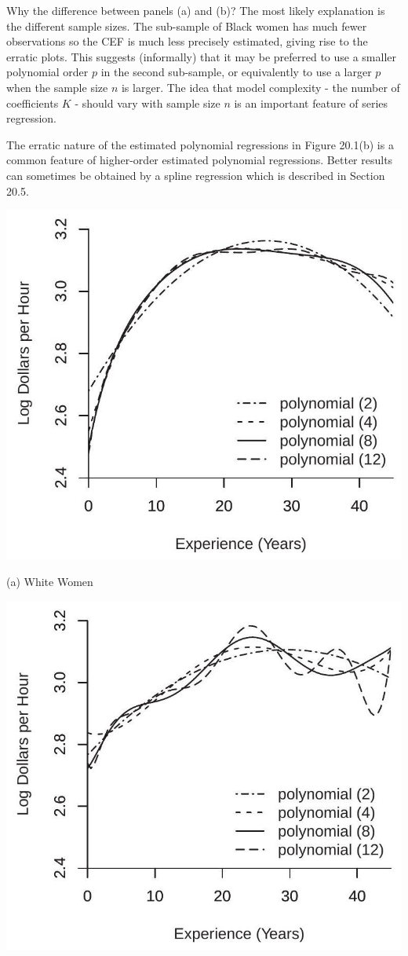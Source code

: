 \documentclass[10pt]{article}
\begin{document}
Why the difference between panels (a) and (b)? The most likely explanation is the different sample sizes. The sub-sample of Black women has much fewer observations so the CEF is much less precisely estimated, giving rise to the erratic plots. This suggests (informally) that it may be preferred to use a smaller polynomial order $p$ in the second sub-sample, or equivalently to use a larger $p$ when the sample size $n$ is larger. The idea that model complexity - the number of coefficients $K$ - should vary with sample size $n$ is an important feature of series regression.

The erratic nature of the estimated polynomial regressions in Figure 20.1(b) is a common feature of higher-order estimated polynomial regressions. Better results can sometimes be obtained by a spline regression which is described in Section 20.5.

\includegraphics[max width=\textwidth]{2022_10_23_2b38d6d54e7725c196e7g-03}

(a) White Women

\includegraphics[max width=\textwidth]{2022_10_23_2b38d6d54e7725c196e7g-03(1)}
\end{document}
